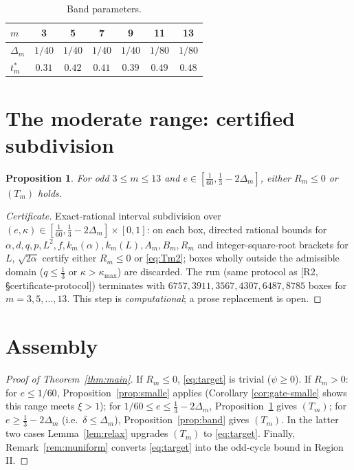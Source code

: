 \documentclass[11pt]{amsart}
\newtheorem{proposition}[theorem]{Proposition}
\begin{document}
\begin{table}\centering
\begin{tabular}{lcccccc}\toprule
$m$&3&5&7&9&11&13\\\midrule
$\Delta_m$&$1/40$&$1/40$&$1/40$&$1/40$&$1/80$&$1/80$\\
$t^*_m$&$0.31$&$0.42$&$0.41$&$0.39$&$0.49$&$0.48$\\\bottomrule
\end{tabular}\caption{Band parameters.}\label{tab:band}
\end{table}

\section{The moderate range: certified subdivision}

\begin{proposition}\label{prop:moderate}
For odd $3\le m\le13$ and $e\in[\tfrac1{60},\tfrac13-2\Delta_m]$, either
$R_m\le0$ or $(T_m)$ holds.
\end{proposition}

\begin{proof}[Certificate]
Exact-rational interval subdivision over
$(e,\kappa)\in[\tfrac1{60},\tfrac13-2\Delta_m]\times[0,1]$: on each box,
directed rational bounds for $\alpha,d,q,p,L^2,f,k_m(\alpha),k_m(L),A_m,B_m,
R_m$ and integer-square-root brackets for $L$, $\sqrt{2\alpha}$ certify
either $R_m\le0$ or \eqref{eq:Tm2}; boxes wholly outside the admissible
domain ($q\le\tfrac13$ or $\kappa>\kappa_{\max}$) are discarded.  The run
(same protocol as [R2, \S certificate-protocol]) terminates with
$6757,3911,3567,4307,6487,8785$ boxes for $m=3,5,\dots,13$.  This step is
\emph{computational}; a prose replacement is open.
\end{proof}

\section{Assembly}

\begin{proof}[Proof of Theorem~\ref{thm:main}]
If $R_m\le0$, \eqref{eq:target} is trivial ($\psi\ge0$).  If $R_m>0$:
for $e\le1/60$, Proposition~\ref{prop:smalle} applies (Corollary
\ref{cor:gate-smalle} shows this range meets $\xi>1$);
for $1/60\le e\le\tfrac13-2\Delta_m$, Proposition~\ref{prop:moderate}
gives $(T_m)$; for $e\ge\tfrac13-2\Delta_m$ (i.e.\ $\delta\le\Delta_m$),
Proposition~\ref{prop:band} gives $(T_m)$.  In the latter two cases
Lemma~\ref{lem:relax} upgrades $(T_m)$ to \eqref{eq:target}.
Finally, Remark~\ref{rem:muniform} converts \eqref{eq:target} into the
odd-cycle bound in Region II.
\end{proof}
\end{document}
